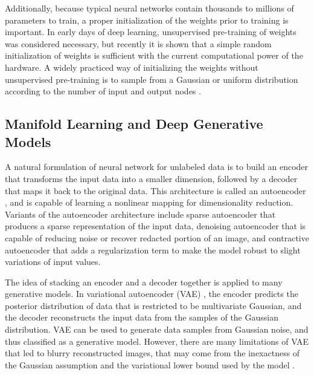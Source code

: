 Additionally, because typical neural networks contain thousands to millions of parameters to train, a proper initialization of the weights prior to training is important.
In early days of deep learning, unsupervised pre-training of weights \cite{bengio2007greedy,erhan2010pretraining} was considered necessary, but recently it is shown that a simple random initialization of weights is sufficient with the current computational power of the hardware.
A widely practiced way of initializing the weights without unsupervised pre-training is to sample from a Gaussian or uniform distribution according to the number of input and output nodes \cite{glorot2010initialization,he2015prelu}.

\subsection{Manifold Learning and Deep Generative Models}

A natural formulation of neural network for unlabeled data is to build an encoder that transforms the input data into a smaller dimension, followed by a decoder that maps it back to the original data.
This architecture is called an autoencoder \cite{bengio2009deeplearning}, and is capable of learning a nonlinear mapping for dimensionality reduction.
Variants of the autoencoder architecture include sparse autoencoder \cite{ng2011sparse} that produces a sparse representation of the input data, denoising autoencoder \cite{vincent2008denoising} that is capable of reducing noise or recover redacted portion of an image, and contractive autoencoder \cite{rifai2011contractive} that adds a regularization term to make the model robust to slight variations of input values.

The idea of stacking an encoder and a decoder together is applied to many generative models.
In variational autoencoder (VAE) \cite{kingma2013vae}, the encoder predicts the posterior distribution of data that is restricted to be multivariate Gaussian, and the decoder reconstructs the input data from the samples of the Gaussian distribution.
VAE can be used to generate data samples from Gaussian noise, and thus classified as a generative model.
However, there are many limitations of VAE that led to blurry reconstructed images, that may come from the inexactness of the Gaussian assumption and the variational lower bound used by the model \cite{doersch2016tutorial}.

